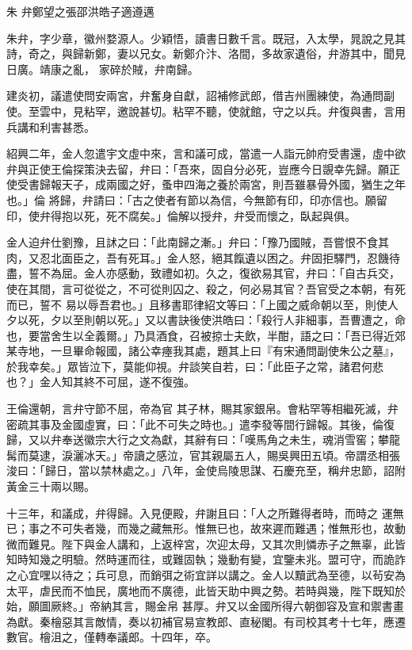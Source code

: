 
\begin{pinyinscope}

 朱
 弁鄭望之張邵洪皓子適遵邁



 朱弁，字少章，徽州婺源人。少穎悟，讀書日數千言。既冠，入太學，晁說之見其詩，奇之，與歸新鄭，妻以兄女。新鄭介汴、洛間，多故家遺俗，弁游其中，聞見日廣。靖康之亂，
 家碎於賊，弁南歸。



 建炎初，議遣使問安兩宮，弁奮身自獻，詔補修武郎，借吉州團練使，為通問副使。至雲中，見粘罕，邀說甚切。粘罕不聽，使就館，守之以兵。弁復與書，言用兵講和利害甚悉。



 紹興二年，金人忽遣宇文虛中來，言和議可成，當遣一人詣元帥府受書還，虛中欲弁與正使王倫探策決去留，弁曰：「吾來，固自分必死，豈應今日覬幸先歸。願正使受書歸報天子，成兩國之好，蚤申四海之養於兩宮，則吾雖暴骨外國，猶生之年也。」倫
 將歸，弁請曰：「古之使者有節以為信，今無節有印，印亦信也。願留印，使弁得抱以死，死不腐矣。」倫解以授弁，弁受而懷之，臥起與俱。



 金人迫弁仕劉豫，且訹之曰：「此南歸之漸。」弁曰：「豫乃國賊，吾嘗恨不食其肉，又忍北面臣之，吾有死耳。」金人怒，絕其餼遺以困之。弁固拒驛門，忍饑待盡，誓不為屈。金人亦感動，致禮如初。久之，復欲易其官，弁曰：「自古兵交，使在其間，言可從從之，不可從則囚之、殺之，何必易其官？吾官受之本朝，有死而已，誓不
 易以辱吾君也。」且移書耶律紹文等曰：「上國之威命朝以至，則使人夕以死，夕以至則朝以死。」又以書訣後使洪皓曰：「殺行人非細事，吾曹遭之，命也，要當舍生以全義爾。」乃具酒食，召被掠士夫飲，半酣，語之曰：「吾已得近郊某寺地，一旦畢命報國，諸公幸瘞我其處，題其上曰『有宋通問副使朱公之墓』，於我幸矣。」眾皆泣下，莫能仰視。弁談笑自若，曰：「此臣子之常，諸君何悲也？」金人知其終不可屈，遂不復強。



 王倫還朝，言弁守節不屈，帝為官
 其子林，賜其家銀帛。會粘罕等相繼死滅，弁密疏其事及金國虛實，曰：「此不可失之時也。」遣李發等間行歸報。其後，倫復歸，又以弁奉送徽宗大行之文為獻，其辭有曰：「嘆馬角之未生，魂消雪窖；攀龍髯而莫逮，淚灑冰天。」帝讀之感泣，官其親屬五人，賜吳興田五頃。帝謂丞相張浚曰：「歸日，當以禁林處之。」八年，金使烏陵思謀、石慶充至，稱弁忠節，詔附黃金三十兩以賜。



 十三年，和議成，弁得歸。入見便殿，弁謝且曰：「人之所難得者時，而時之
 運無已；事之不可失者幾，而幾之藏無形。惟無已也，故來遲而難遇；惟無形也，故動微而難見。陛下與金人講和，上返梓宮，次迎太母，又其次則憐赤子之無辜，此皆知時知幾之明驗。然時運而往，或難固執；幾動有變，宜鑒未兆。盟可守，而詭詐之心宜嘿以待之；兵可息，而銷弭之術宜詳以講之。金人以黷武為至德，以茍安為太平，虐民而不恤民，廣地而不廣德，此皆天助中興之勢。若時與幾，陛下既知於始，願圖厥終。」帝納其言，賜金帛
 甚厚。弁又以金國所得六朝御容及宣和禦書畫為獻。秦檜惡其言敵情，奏以初補官易宣教郎、直秘閣。有司校其考十七年，應遷數官。檜沮之，僅轉奉議郎。十四年，卒。




\end{pinyinscope}
